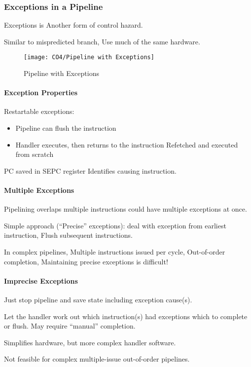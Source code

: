 \subsubsection{Exceptions in a Pipeline}
Exceptions is Another form of control hazard. 

Similar to mispredicted branch, Use much of the same hardware. 

\begin{figure}[!htb]
    \centering
    \texttt{[image: CO4/Pipeline with Exceptions]}
    \caption{Pipeline with Exceptions}
\end{figure}

\paragraph{Exception Properties}
Restartable exceptions:
\begin{itemize}\small
    \item Pipeline can flush the instruction
    \item Handler executes, then returns to the instruction
    \subitem Refetched and executed from scratch
\end{itemize}

PC saved in SEPC register Identifies causing instruction. 

\paragraph{Multiple Exceptions}
Pipelining overlaps multiple instructions could have multiple exceptions at once. 

Simple approach (``Precise'' exceptions): deal with exception from earliest instruction, Flush subsequent instructions. 

In complex pipelines, Multiple instructions issued per cycle, Out-of-order completion, Maintaining precise exceptions is difficult!

\paragraph{Imprecise Exceptions}
Just stop pipeline and save state including exception cause(s). 

Let the handler work out which instruction(s) had exceptions which to complete or flush. May require ``manual'' completion.

Simplifies hardware, but more complex handler software. 

Not feasible for complex multiple-issue out-of-order pipelines. 

